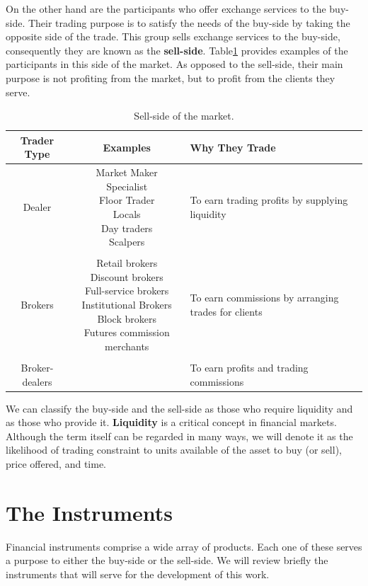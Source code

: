 \documentclass[../TGMAFFIRO]{subfiles}
\begin{document}
 On the other hand are the participants who offer exchange services to the buy-side. Their trading purpose is to satisfy the needs of the buy-side by taking the opposite side of the trade. This group sells exchange services to the buy-side, consequently they are known as the \textbf{sell-side}. Table\ref{table:sell-side} provides examples of the participants in this side of the market. As opposed to the sell-side, their main purpose is not profiting from the market, but to profit from the clients they serve.\\

\begin{table}[h!] \label{table:sell-side}
    \centering
    \begin{tabular}{c c m{3cm}}
    	\hline
    	Trader Type & Examples & Why They Trade \\
    	\hline
    	Dealer & \breakcell{Market Maker \\ Specialist \\ Floor Trader \\ Locals \\ Day traders \\ Scalpers} & {To earn trading profits by supplying liquidity} \\
    	\\  	
    	Brokers & \breakcell{Retail brokers \\ Discount brokers \\ Full-service brokers \\ Institutional Brokers \\ Block brokers \\ Futures commission merchants} & {To earn commissions by arranging trades for clients} \\
    	\\
    	Broker-dealers & \breakcell{Wirehouses} & {To earn profits and trading commissions} \\
    	\hline
    \end{tabular}
    \caption{Sell-side of the market. }
\end{table}

We can classify the buy-side and the sell-side as those who require liquidity and as those who provide it. \textbf{Liquidity} is a critical concept in financial markets. Although the term itself can be regarded in many ways, we will denote it as the likelihood of trading constraint to units available of the asset to buy (or sell), price offered, and time.

\section{The Instruments}
Financial instruments comprise a wide array of products. Each one of these serves a purpose to either the buy-side or the sell-side. We will review briefly the instruments that will serve for the development of this work.
\end{document}
